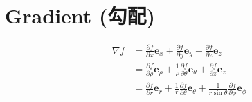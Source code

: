 %
%
%
%
%
\section{Gradient (勾配)}

\begin{align}
  \nabla f
      & = \frac{\partial f}{\partial x}\mathbf{e}_x + \frac{\partial f}{\partial y}\mathbf{e}_y + \frac{\partial f}{\partial z}\mathbf{e}_z  \\
      & = \frac{\partial f}{\partial \rho}\mathbf{e}_\rho + \frac{1}{\rho}\frac{\partial f}{\partial \theta}\mathbf{e}_\theta + \frac{\partial f}{\partial z}\mathbf{e}_z \\
      & = \frac{\partial f}{\partial r}\mathbf{e}_r + \frac{1}{r}\frac{\partial f}{\partial \theta}\mathbf{e}_\theta + \frac{1}{r \sin\theta}\frac{\partial f}{\partial \phi}\mathbf{e}_\phi
\end{align}
